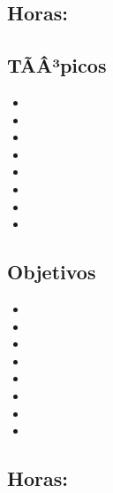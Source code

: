 \subsection{\ALDOSDef}\label{sec:BOK-AL2}
\subsection*{Horas: \ALDOSHours}

\subsection*{TÃÂ³picos}
\begin{itemize}
	\item \ALDOSTopicAlgoritmos
	\item \ALDOSTopicAlgoritmosgolosos
	\item \ALDOSTopicDividir
	\item \ALDOSTopicRegresion
	\item \ALDOSTopicBifurcacion
	\item \ALDOSTopicHeuristicas
	\item \ALDOSTopicCasamiento
	\item \ALDOSTopicAlgoritmosde
\end{itemize}

\subsection*{Objetivos}
\begin{itemize}
	\item \ALDOSObjUNO
	\item \ALDOSObjDOS
	\item \ALDOSObjTRES
	\item \ALDOSObjCUATRO
	\item \ALDOSObjCINCO
	\item \ALDOSObjSEIS
	\item \ALDOSObjSIETE
	\item \ALDOSObjOCHO
\end{itemize}

\subsection{\ALTRESDef}\label{sec:BOK-AL3}
\subsection*{Horas: \ALTRESHours}

